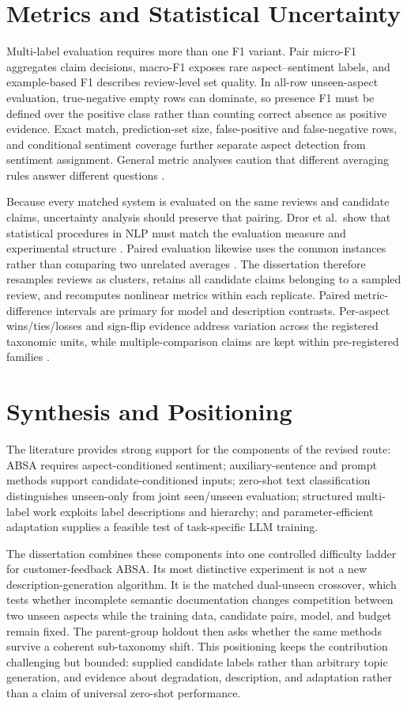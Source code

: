 \section{Metrics and Statistical Uncertainty}

Multi-label evaluation requires more than one F1 variant. Pair micro-F1
aggregates claim decisions, macro-F1 exposes rare aspect--sentiment labels, and
example-based F1 describes review-level set quality. In all-row unseen-aspect
evaluation, true-negative empty rows can dominate, so presence F1 must be
defined over the positive class rather than counting correct absence as
positive evidence. Exact match, prediction-set size, false-positive and
false-negative rows, and conditional sentiment coverage further separate
aspect detection from sentiment assignment. General metric analyses caution
that different averaging rules answer different questions
\cite{sokolova2009systematic}.

Because every matched system is evaluated on the same reviews and candidate
claims, uncertainty analysis should preserve that pairing. Dror et al.\ show
that statistical procedures in NLP must match the evaluation measure and
experimental structure \cite{dror2018hitchhiker}. Paired evaluation likewise
uses the common instances rather than comparing two unrelated averages
\cite{peyrard2021paired}. The dissertation therefore resamples reviews as
clusters, retains all candidate claims belonging to a sampled review, and
recomputes nonlinear metrics within each replicate. Paired metric-difference
intervals are primary for model and description contrasts. Per-aspect
wins/ties/losses and sign-flip evidence address variation across the registered
taxonomic units, while multiple-comparison claims are kept within
pre-registered families \cite{dror2017replicability}.

\section{Synthesis and Positioning}

The literature provides strong support for the components of the revised
route: ABSA requires aspect-conditioned sentiment; auxiliary-sentence and
prompt methods support candidate-conditioned inputs; zero-shot text
classification distinguishes unseen-only from joint seen/unseen evaluation;
structured multi-label work exploits label descriptions and hierarchy; and
parameter-efficient adaptation supplies a feasible test of task-specific LLM
training.

The dissertation combines these components into one controlled difficulty
ladder for customer-feedback ABSA. Its most distinctive experiment is not a new
description-generation algorithm. It is the matched dual-unseen crossover,
which tests whether incomplete semantic documentation changes competition
between two unseen aspects while the training data, candidate pairs, model, and
budget remain fixed. The parent-group holdout then asks whether the same methods
survive a coherent sub-taxonomy shift. This positioning keeps the contribution
challenging but bounded: supplied candidate labels rather than arbitrary topic
generation, and evidence about degradation, description, and adaptation rather
than a claim of universal zero-shot performance.
